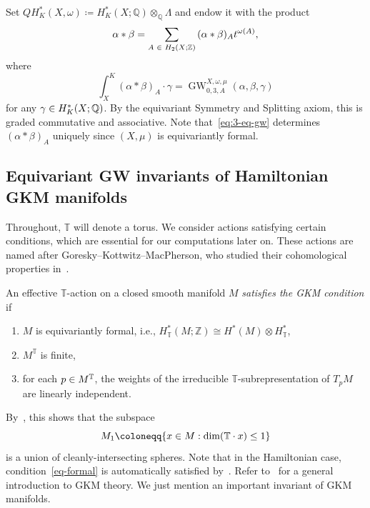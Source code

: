 \documentclass[AHL,Unicode,longabstracts]{cedram}
\newcommand{\concat}{\ast}
\newcommand{\bQ}{\mathbb{Q}}
\newcommand{\bT}{\mathbb{T}}
\newcommand{\bZ}{\mathbb{Z}}
\DeclareMathOperator{\GW}{GW}
\let\oldin\in
\renewcommand{\in}{\mathchoice{\oldin}{\oldin}{\,\oldin\,}{\,\oldin\,}}
\begin{document}
Set $QH_K^*(X,\omega) \coloneqq H^*_K(X;\bQ)\otimes_\bQ \Lambda$ and endow it with the product
\begin{equation*}
\alpha \concat \beta = \sum_{A\in H_2(X;\bZ)}{(\alpha\concat \beta)_A t^{\omega(A)}},
\end{equation*}
where
\begin{equation}\label{eq:3-eq-gw}
\int_{X}^K(\alpha\concat \beta)_A\cdot \gamma = \GW^{X,\omega,\mu}_{0,3,A}(\alpha,\beta,\gamma)
\end{equation}
for any $\gamma\in H^*_K(X;\bQ)$. By the equivariant Symmetry and Splitting axiom, this is graded commutative and associative. Note that~\eqref{eq:3-eq-gw} determines $(\alpha \concat \beta)_A$ uniquely since $(X,\mu)$ is equivariantly formal.


\subsection{Equivariant GW invariants of Hamiltonian GKM manifolds}\label{subsubsec:computations-gw}
Throughout, $\bT$ will denote a torus. We consider actions satisfying certain conditions, which are essential for our computations later on. These actions are named after Goresky--Kottwitz--MacPherson, who studied their cohomological properties in~\cite{GKM98}.

\begin{defi}\label{de:gkm}
An effective $\bT$-action on a closed smooth manifold $M$ \emph{satisfies the GKM condition} if
\begin{enumerate}
\item\label{eq-formal}
$M$ is equivariantly formal, i.e., $H^*_\bT(M;\bZ)\cong H^*(M)\otimes H^*_\bT$,
\item\label{defi5.18.2} $M^\bT$ is finite,
\item\label{defi5.18.3} for each $p \in M^\bT$, the weights of the irreducible $\bT$-subrepresentation of $T_pM$ are linearly independent.
\end{enumerate}
\end{defi}

By~\cite[Proposition~2.3]{GKZ22b}, this shows that the subspace
\[
M_1 \coloneqq \{x \in M:\dim(\bT\cdot x) \leq 1\}
\]
is a union of cleanly-intersecting spheres. Note that in the Hamiltonian case, condition~\eqref{eq-formal} is automatically satisfied by~\cite[Proposition~5.8]{Kir84}. Refer to~\cite{Kur09} for a general introduction to GKM theory. We just mention an important invariant of GKM manifolds.
\end{document}
